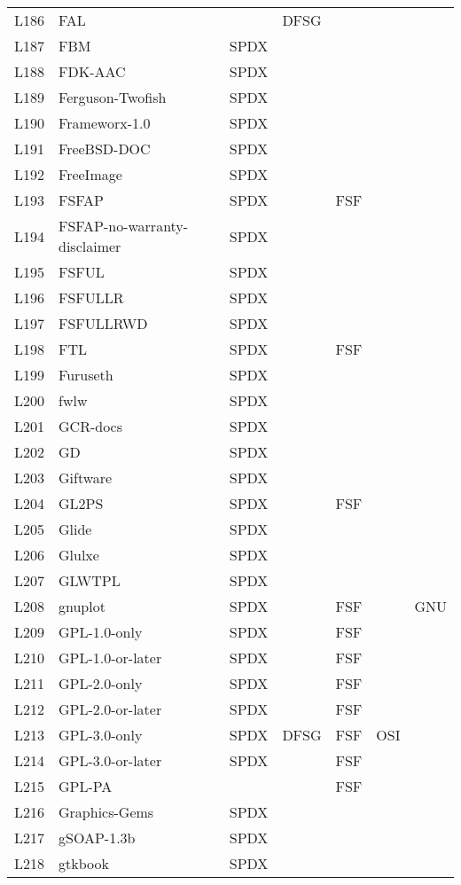 \begin{longtable}[h]{m{2cm} | m{7cm} | c | c | c | c | c}
L186 & FAL &  & DFSG &  &  &  \\
L187 & FBM & SPDX &  &  &  &  \\
L188 & FDK-AAC & SPDX &  &  &  &  \\
L189 & Ferguson-Twofish & SPDX &  &  &  &  \\
L190 & Frameworx-1.0 & SPDX &  &  &  &  \\
L191 & FreeBSD-DOC & SPDX &  &  &  &  \\
L192 & FreeImage & SPDX &  &  &  &  \\
L193 & FSFAP & SPDX &  & FSF &  &  \\
L194 & FSFAP-no-warranty-disclaimer & SPDX &  &  &  &  \\
L195 & FSFUL & SPDX &  &  &  &  \\
L196 & FSFULLR & SPDX &  &  &  &  \\
L197 & FSFULLRWD & SPDX &  &  &  &  \\
L198 & FTL & SPDX &  & FSF &  &  \\
L199 & Furuseth & SPDX &  &  &  &  \\
L200 & fwlw & SPDX &  &  &  &  \\
L201 & GCR-docs & SPDX &  &  &  &  \\
L202 & GD & SPDX &  &  &  &  \\
L203 & Giftware & SPDX &  &  &  &  \\
L204 & GL2PS & SPDX &  & FSF &  &  \\
L205 & Glide & SPDX &  &  &  &  \\
L206 & Glulxe & SPDX &  &  &  &  \\
L207 & GLWTPL & SPDX &  &  &  &  \\
L208 & gnuplot & SPDX &  & FSF &  & GNU \\
L209 & GPL-1.0-only & SPDX &  & FSF &  &  \\
L210 & GPL-1.0-or-later & SPDX &  & FSF &  &  \\
L211 & GPL-2.0-only & SPDX &  & FSF &  &  \\
L212 & GPL-2.0-or-later & SPDX &  & FSF &  &  \\
L213 & GPL-3.0-only & SPDX & DFSG & FSF & OSI &  \\
L214 & GPL-3.0-or-later & SPDX &  & FSF &  &  \\
L215 & GPL-PA &  &  & FSF &  &  \\
L216 & Graphics-Gems & SPDX &  &  &  &  \\
L217 & gSOAP-1.3b & SPDX &  &  &  &  \\
L218 & gtkbook & SPDX &  &  &  &  \\

\end{longtable}
